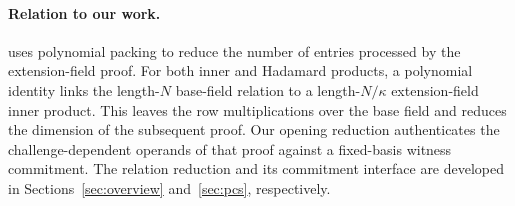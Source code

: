 \paragraph{Relation to our work.}
\methodname uses polynomial packing to reduce the number of entries
processed by the extension-field proof.
For both inner and Hadamard products, a polynomial identity links
the length-\(N\) base-field relation to a length-\(N/\kappa\)
extension-field inner product. This leaves the row multiplications
over the base field and reduces the dimension of the subsequent
proof.
Our opening reduction authenticates the challenge-dependent
operands of that proof against a fixed-basis witness commitment.
The relation reduction and its commitment interface are developed
in Sections~\ref{sec:overview} and~\ref{sec:pcs}, respectively.
